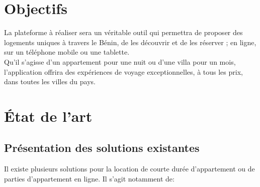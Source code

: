 \section{Objectifs}
La plateforme à réaliser sera un véritable outil qui permettra de proposer des logements uniques à travers le Bénin, de les découvrir et de les réserver ; en ligne, sur un téléphone mobile ou une tablette.
\\Qu'il s'agisse d'un appartement pour une nuit ou d'une villa pour un mois, l’application offrira des expériences de voyage exceptionnelles, à tous les prix, dans toutes les villes du pays.

\section{État de l’art} 

\subsection{Présentation des solutions existantes} 
Il existe plusieurs solutions pour la location de courte durée d’appartement ou de parties d’appartement en ligne. Il s’agit notamment de:

